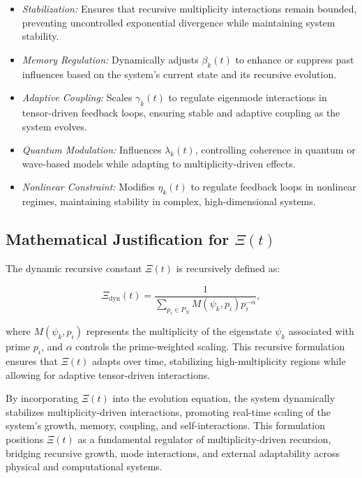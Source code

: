 \documentclass{article}
\theoremstyle{plain}
\begin{document}
\begin{itemize}
\begin{itemize}
    \item \textit{Stabilization:} Ensures that recursive multiplicity interactions remain bounded, preventing uncontrolled exponential divergence while maintaining system stability.
    \item \textit{Memory Regulation:} Dynamically adjusts \( \beta_k(t) \) to enhance or suppress past influences based on the system's current state and its recursive evolution.
    \item \textit{Adaptive Coupling:} Scales \( \gamma_k(t) \) to regulate eigenmode interactions in tensor-driven feedback loops, ensuring stable and adaptive coupling as the system evolves.
    \item \textit{Quantum Modulation:} Influences \( \lambda_k(t) \), controlling coherence in quantum or wave-based models while adapting to multiplicity-driven effects.
    \item \textit{Nonlinear Constraint:} Modifies \( \eta_k(t) \) to regulate feedback loops in nonlinear regimes, maintaining stability in complex, high-dimensional systems.
\end{itemize}

\subsection{Mathematical Justification for \(\Xi(t) \)}

The dynamic recursive constant \(\Xi(t) \) is recursively defined as:

\begin{equation}
\Xi_{\text{dyn}}(t) = \frac{1}{\sum_{p_i \in P_N} M(\psi_k, p_i) p_i^{-\alpha}},
\end{equation}

where \( M(\psi_k, p_i) \) represents the multiplicity of the eigenstate \( \psi_k \) associated with prime \( p_i \), and \( \alpha \) controls the prime-weighted scaling. This recursive formulation ensures that \(\Xi(t) \) adapts over time, stabilizing high-multiplicity regions while allowing for adaptive tensor-driven interactions.

By incorporating \(\Xi(t) \) into the evolution equation, the system dynamically stabilizes multiplicity-driven interactions, promoting real-time scaling of the system's growth, memory, coupling, and self-interactions. This formulation positions \(\Xi(t) \) as a fundamental regulator of multiplicity-driven recursion, bridging recursive growth, mode interactions, and external adaptability across physical and computational systems.



\end{itemize}
\end{document}
